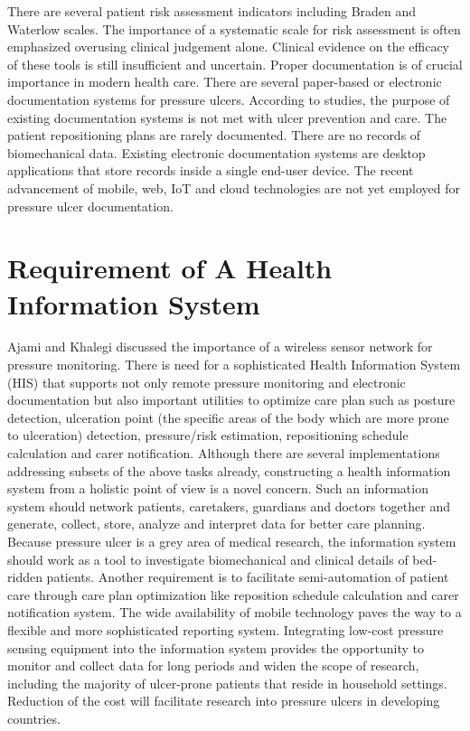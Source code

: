 There are several patient risk assessment indicators including Braden and Waterlow scales. \cite{bradenscale} The importance of a systematic scale for risk assessment is often emphasized overusing clinical judgement alone. Clinical evidence on the efficacy of these tools is still insufficient and uncertain.\cite{cochranerisk}
Proper documentation is of crucial importance in modern health care. There are several paper-based or electronic documentation systems for pressure ulcers. According to studies, the purpose of existing documentation systems is not met with ulcer prevention and care.\cite{sostoolkit} The patient repositioning plans are rarely documented. There are no records of biomechanical data. Existing electronic documentation systems are desktop applications that store records inside a single end-user device. The recent advancement of mobile, web, IoT and cloud technologies are not yet employed for pressure ulcer documentation. 

\section{Requirement of A Health Information System}
Ajami and Khalegi discussed the importance of a wireless sensor network for pressure monitoring.\cite{his} There is need for a sophisticated Health Information System (HIS) that supports not only remote pressure monitoring and electronic documentation but also important utilities to optimize care plan such as posture detection, ulceration point (the specific areas of the body which are more prone to ulceration) detection, pressure/risk estimation, repositioning schedule calculation and carer notification. Although there are several implementations addressing subsets of the above tasks already, constructing a health information system from a holistic point of view is a novel concern. Such an information system should network patients, caretakers, guardians and doctors together and generate, collect, store, analyze and interpret data for better care planning. Because pressure ulcer is a grey area of medical research, the information system should work as a tool to investigate biomechanical and clinical details of bed-ridden patients. Another requirement is to facilitate semi-automation of patient care through care plan optimization like reposition schedule calculation and carer notification system. The wide availability of mobile technology paves the way to a flexible and more sophisticated reporting system. Integrating low-cost pressure sensing equipment into the information system provides the opportunity to monitor and collect data for long periods and widen the scope of research, including the majority of ulcer-prone patients that reside in household settings. Reduction of the cost will facilitate research into pressure ulcers in developing countries.

